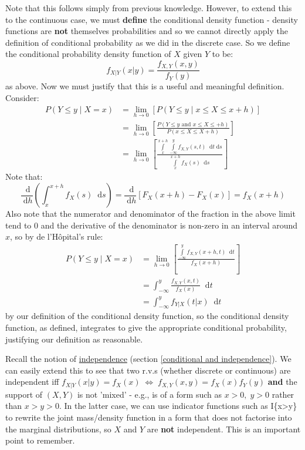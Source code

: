 \documentclass[12pt,a4paper]{article}
\newcommand{\diff}{\;\mathrm{d}}
\begin{document}
Note that this follows simply from previous knowledge. However, to extend this to the continuous case, we must \textbf{define} the conditional density function - density functions are \textbf{not} themselves probabilities and so we cannot directly apply the definition of conditional probability as we did in the discrete case. So we define the conditional probability density function of $X$ given $Y$ to be:
$$f_{X|Y}(x|y) = \frac{f_{X,Y}(x,y)}{f_Y(y)}$$
as above. Now we must justify that this is a useful and meaningful definition. Consider:
\begin{align*}
P(Y\leq y\; | \; X=x) &= \lim_{h\rightarrow 0} [P(Y\leq y\; | \; x\leq X\leq x+h)]\\
&= \lim_{h\rightarrow 0} \left[\frac{P(Y\leq y \text{ and } x\leq X \leq +h)}{P(x\leq X \leq X+h)}\right]\\
&= \lim_{h\rightarrow 0} \left[\frac{\int\limits_x^{x+h}\!\!\int\limits_{-\infty}^y\!\! f_{X,Y}(s,t)\;\diff t\diff s}{\int\limits_x^{x+h}\!\! f_X(s)\;\diff s}\right]
\end{align*}
Note that:
$$\frac{\diff}{\diff h}\!\left(\int_x^{x+h}\!\!\!\!f_X(s)\;\diff s\right) = \frac{\diff}{\diff h}\!\left[F_X(x+h)-F_X(x)\right] = f_X\!(x+h)$$
Also note that the numerator and denominator of the fraction in the above limit tend to 0 and the derivative of the denominator is non-zero in an interval around $x$, so by de l'H\^opital's rule:
\begin{align*}
P(Y\leq y\; | \; X=x) &= \lim_{h\rightarrow 0}\left[\frac{\int\limits_{-\infty}^y\!\! f_{X,Y}(x+h,t)\;\diff t}{f_X(x+h)}\right]\\
&= \int_{-\infty}^y\!\!\frac{f_{X,Y}(x,t)}{f_X(x)}\;\diff t\\
&= \int_{-\infty}^y\!\! f_{Y|X}(t|x)\;\diff t
\end{align*}
by our definition of the conditional density function, so the conditional density function, as defined, integrates to give the appropriate conditional probability, justifying our definition as reasonable.

Recall the notion of \underline{independence} (section \ref{conditional and independence}). We can easily extend this to see that two r.v.s (whether discrete or continuous) are independent iff $f_{X|Y}(x|y) = f_X(x) \; \Leftrightarrow \; f_{X,Y}(x,y) = f_X(x)f_Y(y)$ \textbf{and} the support of $(X,Y)$ is not 'mixed' - e.g., is of a form such as $x>0,\; y>0$ rather than $x>y>0$. In the latter case, we can use indicator functions such as I\{x>y\} to rewrite the joint mass/density function in a form that does not factorise into the marginal distributions, so $X$ and $Y$ are \textbf{not} independent. This is an important point to remember.
\end{document}
